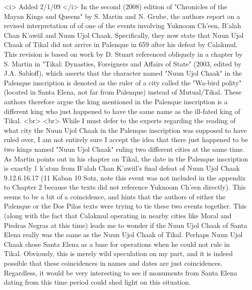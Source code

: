 <i> Added 2/1/09 </i> In the second (2008) edition of "Chronicles of the Mayan Kings and Queens" by S. Martin and N. Grube, the authors report on a revised interpretation of of one of the events involving Yuknoom Ch'een, B'alah Chan K'awiil and Nuun Ujol Chaak. Specifically, they now state that Nuun Ujol Chaak of Tikal did not arrive in Palenque in 659 after his defeat by Calakmul. This revision is based on work by D. Stuart referenced obliquely in a chapter by S. Martin in "Tikal: Dynasties, Foreigners and Affairs of State" (2003, edited by J.A. Sabloff), which asserts that the character named "Nuun Ujol Chaak" in the Palenque inscription is denoted as the ruler of a city called the "Wa-bird polity" (located in Santa Elena, not far from Palenque) instead of Mutual/Tikal. These authors therefore argue the king mentioned in the Palenque inscription is a different king who just happened to have the same name as the ill-fated king of Tikal.
<br>
<br>
While I must defer to the experts regarding the reading of what city the Nuun Ujol Chaak in the Palenque inscription was supposed to have ruled over, I am not entirely sure I accept the idea that there just happened to be two kings named "Nuun Ujol Chaak" ruling two different cities at the same time. As Martin points out in his chapter on Tikal, the date in the Palenque inscription is exactly 1 k'atun from B'alah Chan K'awiil's final defeat of Nuun Ujol Chaak 9.12.6.16.17 (11 Kaban 10 Sotz, note this event was not included in the appendix to Chapter 2 because the texts did not reference Yuknoom Ch'een directly). This seems to be a bit of a coincidence, and hints that the authors of either the Palenque or the Dos Pilas texts were trying to tie these two events together. This (along with the fact that Calakmul operating in nearby cities like Moral and Piedras Negras at this time) leads me to wonder if the Nuun Ujol Chaak of Santa Elena really was the same as the Nuun Ujol Chaak of Tikal. Perhaps Nuun Ujol Chaak chose Santa Elena as a base for operations when he could not rule in Tikal. Obviously, this is merely wild speculation on my part, and it is indeed possible that these coincidences in names and dates are just coincidences. Regardless, it would be very interesting to see if monuments from Santa Elena dating from this time period could shed light on this situation.
 